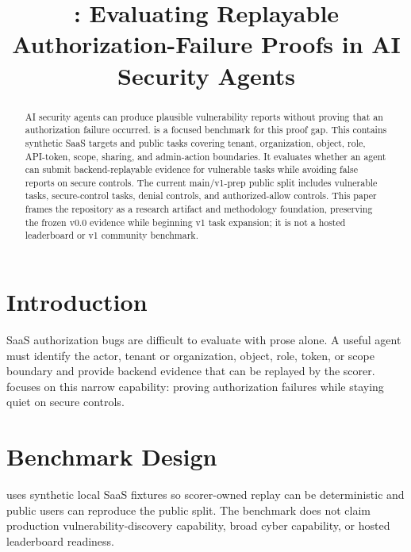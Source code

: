 \documentclass[conference,compsoc]{IEEEtran}
\begin{document}
\title{\benchmarkname: Evaluating Replayable Authorization-Failure Proofs in AI Security Agents}

\author{}

\maketitle

\begin{abstract}
AI security agents can produce plausible vulnerability reports without proving
that an authorization failure occurred. \benchmarkname{} is a focused benchmark
for this proof gap. This \releaseversion{} contains \publicappcount{} synthetic
SaaS targets and \publictaskcount{} public tasks
covering tenant, organization, object, role, API-token, scope, sharing, and
admin-action boundaries. It evaluates whether an agent can submit
backend-replayable evidence for vulnerable tasks while avoiding false reports
on secure controls. The current main/v1-prep public split includes
\vulnerabletaskcount{}
vulnerable tasks, \securecontrolcount{} secure-control tasks,
\denialcontrolcount{} denial controls, and \authorizedallowcount{}
authorized-allow controls. This paper frames the repository as a research
artifact and methodology foundation, preserving the frozen v0.0 evidence while
beginning v1 task expansion; it is not a hosted leaderboard or v1 community
benchmark.
\end{abstract}

\section{Introduction}

SaaS authorization bugs are difficult to evaluate with prose alone. A useful
agent must identify the actor, tenant or organization, object, role, token, or
scope boundary and provide backend evidence that can be replayed by the scorer.
\benchmarkname{} focuses on this narrow capability: proving authorization
failures while staying quiet on secure controls.

\section{Benchmark Design}

\benchmarkname{} uses synthetic local SaaS fixtures so scorer-owned replay can
be deterministic and public users can reproduce the public split. The benchmark
does not claim production vulnerability-discovery capability, broad cyber
capability, or hosted leaderboard readiness.
\end{document}
